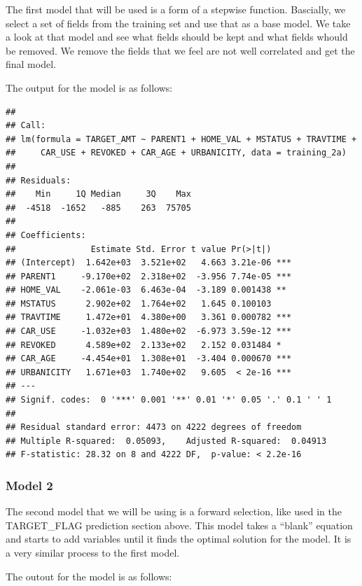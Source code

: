 \documentclass[]{article}
\begin{document}
The first model that will be used is a form of a stepwise function.
Bascially, we select a set of fields from the training set and use that
as a base model. We take a look at that model and see what fields should
be kept and what fields whould be removed. We remove the fields that we
feel are not well correlated and get the final model.

The output for the model is as follows:

\begin{verbatim}
## 
## Call:
## lm(formula = TARGET_AMT ~ PARENT1 + HOME_VAL + MSTATUS + TRAVTIME + 
##     CAR_USE + REVOKED + CAR_AGE + URBANICITY, data = training_2a)
## 
## Residuals:
##    Min     1Q Median     3Q    Max 
##  -4518  -1652   -885    263  75705 
## 
## Coefficients:
##               Estimate Std. Error t value Pr(>|t|)    
## (Intercept)  1.642e+03  3.521e+02   4.663 3.21e-06 ***
## PARENT1     -9.170e+02  2.318e+02  -3.956 7.74e-05 ***
## HOME_VAL    -2.061e-03  6.463e-04  -3.189 0.001438 ** 
## MSTATUS      2.902e+02  1.764e+02   1.645 0.100103    
## TRAVTIME     1.472e+01  4.380e+00   3.361 0.000782 ***
## CAR_USE     -1.032e+03  1.480e+02  -6.973 3.59e-12 ***
## REVOKED      4.589e+02  2.133e+02   2.152 0.031484 *  
## CAR_AGE     -4.454e+01  1.308e+01  -3.404 0.000670 ***
## URBANICITY   1.671e+03  1.740e+02   9.605  < 2e-16 ***
## ---
## Signif. codes:  0 '***' 0.001 '**' 0.01 '*' 0.05 '.' 0.1 ' ' 1
## 
## Residual standard error: 4473 on 4222 degrees of freedom
## Multiple R-squared:  0.05093,    Adjusted R-squared:  0.04913 
## F-statistic: 28.32 on 8 and 4222 DF,  p-value: < 2.2e-16
\end{verbatim}

\subsubsection{Model 2}\label{model-2-1}

The second model that we will be using is a forward selection, like used
in the TARGET\_FLAG prediction section above. This model takes a
``blank'' equation and starts to add variables until it finds the
optimal solution for the model. It is a very similar process to the
first model.

The outout for the model is as follows:
\end{document}
